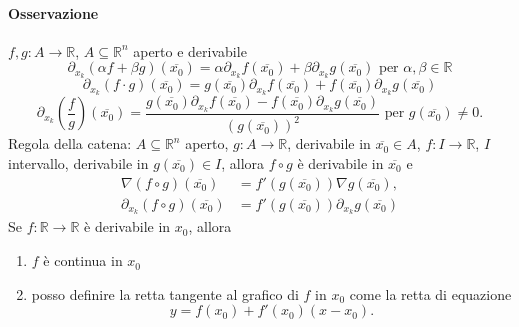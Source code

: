 \documentclass{article}
\newcommand{\R}{\mathbb{R}}
\begin{document}
\paragraph{{Osservazione}}
$f,g:A\rightarrow\R$, $A\subseteq\R^n$ aperto e derivabile
\begin{equation*}
    \partial_{x_k}(\alpha f+\beta g)(\overline{x_0})=\alpha\partial_{x_k}f(\overline{x_0})+\beta\partial_{x_k}g(\overline{x_0}) \text{  per  }   \alpha,\beta\in\R
\end{equation*}
\begin{equation*}
    \partial_{x_k}(f\cdot g)(\overline{x_0})=g(\overline{x_0})\partial_{x_k}f(\overline{x_0})+f(\overline{x_0})\partial_{x_k}g(\overline{x_0})
\end{equation*}
\begin{equation*}
    \partial_{x_k}\left(\frac{f}{g}\right)(\overline{x_0})=\frac{g(\overline{x_0})\partial_{x_k}f(\overline{x_0})-f(\overline{x_0})\partial_{x_k}g(\overline{x_0})}{(g(\overline{x_0}))^2} \text{  per  } g(\overline{x_0})\neq 0.
\end{equation*}
Regola della catena: $A\subseteq \R^n$ aperto, $g:A\rightarrow \R$, derivabile in $\overline{x_0}\in A$, $f:I\rightarrow\R$, $I$ intervallo, derivabile in $g(\overline{x_0})\in I$, allora $f\circ g$ è derivabile in $\overline{x_0}$ e 
\begin{align*}
    \nabla(f \circ g)(\overline{x_0})&=f'(g(\overline{x_0}))\nabla g(\overline{x_0}),\\
    \partial_{x_k}(f\circ g)(\overline{x_0})&=f'(g(\overline{x_0}))\partial_{x_k}g(\overline{x_0})
\end{align*}Se $f:\R\rightarrow\R$ è derivabile in $x_0$, allora
\begin{enumerate}
    \item $f$ è continua in $x_0$
    \item posso definire la retta tangente al grafico di $f$ in $x_0$ come la retta di equazione
    \begin{equation*}
        y=f(x_0)+f'(x_0)(x-x_0).
    \end{equation*}
\end{enumerate}
\end{document}
